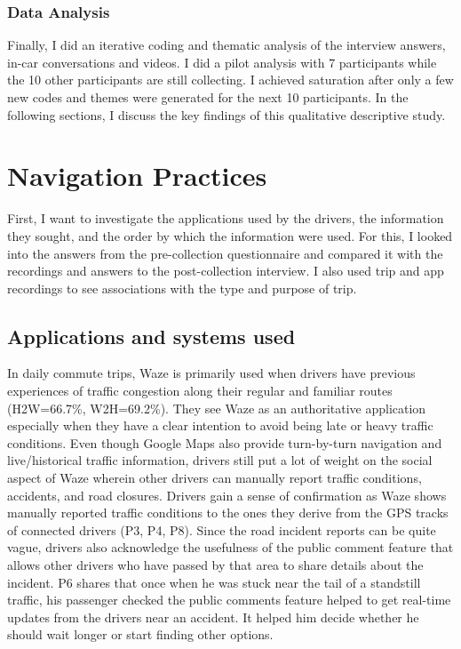 \subsubsection{Data Analysis}
Finally, I did an iterative coding and thematic analysis of the interview answers, in-car conversations and videos. I did a pilot analysis with 7 participants while the 10 other participants are still collecting. I achieved saturation after only a few new codes and themes were generated for the next 10 participants. In the following sections, I discuss the key findings of this qualitative descriptive study.

\section{Navigation Practices}
First, I want to investigate the applications used by the drivers, the information they sought, and the order by which the information were used. For this, I looked into the answers from the pre-collection questionnaire and compared it with the recordings and answers to the post-collection interview. I also used trip and app recordings to see associations with the type and purpose of trip. 

\subsection{Applications and systems used} 
In daily commute trips, Waze is primarily used when drivers have previous experiences of traffic congestion along their regular and familiar routes (H2W=66.7\%, W2H=69.2\%). They see Waze as an authoritative application especially when they have a clear intention to avoid being late or heavy traffic conditions. Even though Google Maps also provide turn-by-turn navigation and live/historical traffic information, drivers still put a lot of weight on the social aspect of Waze wherein other drivers can manually report traffic conditions, accidents, and road closures. Drivers gain a sense of confirmation as Waze shows manually reported traffic conditions to the ones they derive from the GPS tracks of connected drivers (P3, P4, P8). Since the road incident reports can be quite vague, drivers also acknowledge the usefulness of the public comment feature that allows other drivers who have passed by that area to share details about the incident. P6 shares that once when he was stuck near the tail of a standstill traffic, his passenger checked the public comments feature helped to get real-time updates from the drivers near an accident. It helped him decide whether he should wait longer or start finding other options. 

